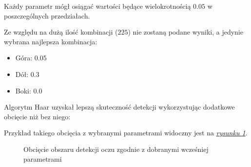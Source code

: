 Każdy parametr mógł osiągać wartości będące wielokrotnością $0.05$ w poszczególnych przedziałach.

\par

Ze względu na dużą ilość kombinacji ($225$) nie zostaną podane wyniki, a jedynie wybrana najlepsza kombinacja:
\begin{itemize}
    \item Góra: $0.05$
    \item Dół: $0.3$
    \item Boki: $0.0$
\end{itemize}

Algorytm Haar uzyskał lepszą skuteczność detekcji wykorzystując dodatkowe obcięcie niż bez niego:



Przykład takiego obcięcia z wybranymi parametrami widoczny jest na \hyperref[{fig:eye_crop}]{\textit{rysunku \ref{fig:eye_crop}}}.

\begin{figure}[!h]
    \begin{center}
        \hspace{8mm}
    \end{center}
    \caption{Obcięcie obszaru detekcji oczu zgodnie z dobranymi wcześniej parametrami}
    \label{fig:eye_crop}
\end{figure}

